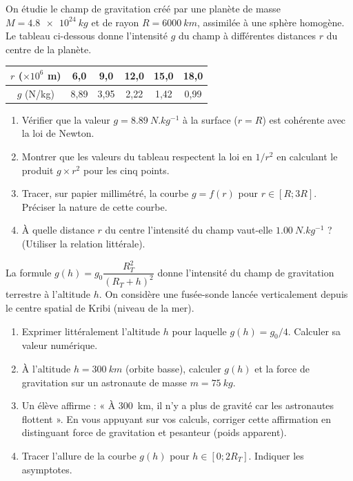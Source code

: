 \documentclass[11pt]{article}
\begin{document}
\begin{exercice}
On étudie le champ de gravitation créé par une planète de masse $M = \SI{4,8e24}{kg}$ et de rayon $R = \SI{6000}{km}$, assimilée à une sphère homogène. Le tableau ci-dessous donne l'intensité $g$ du champ à différentes distances $r$ du centre de la planète.

\begin{center}
\begin{tabular}{|c|c|c|c|c|c|}
\hline
$r$ ($\times 10^6$ m) & 6,0 & 9,0 & 12,0 & 15,0 & 18,0 \\
\hline
$g$ (N/kg) & 8,89 & 3,95 & 2,22 & 1,42 & 0,99 \\
\hline
\end{tabular}
\end{center}

\begin{enumerate}
    \item Vérifier que la valeur $g = \SI{8,89}{N.kg^{-1}}$ à la surface ($r=R$) est cohérente avec la loi de Newton.
    \item Montrer que les valeurs du tableau respectent la loi en $1/r^2$ en calculant le produit $g \times r^2$ pour les cinq points.
    \item Tracer, sur papier millimétré, la courbe $g = f(r)$ pour $r \in [R; 3R]$. Préciser la nature de cette courbe.
    \item À quelle distance $r$ du centre l'intensité du champ vaut-elle $\SI{1,00}{N.kg^{-1}}$ ? (Utiliser la relation littérale).
\end{enumerate}
\end{exercice}

\begin{exercice}
La formule $g(h) = g_0 \dfrac{R_T^2}{(R_T+h)^2}$ donne l'intensité du champ de gravitation terrestre à l'altitude $h$.
On considère une fusée-sonde lancée verticalement depuis le centre spatial de Kribi (niveau de la mer).
\begin{enumerate}
    \item Exprimer littéralement l'altitude $h$ pour laquelle $g(h) = g_0/4$. Calculer sa valeur numérique.
    \item À l'altitude $h = \SI{300}{km}$ (orbite basse), calculer $g(h)$ et la force de gravitation sur un astronaute de masse $m = \SI{75}{kg}$.
    \item Un élève affirme : « À \SI{300}{km}, il n'y a plus de gravité car les astronautes flottent ». En vous appuyant sur vos calculs, corriger cette affirmation en distinguant \og force de gravitation \fg{} et \og pesanteur \fg{} (poids apparent).
    \item Tracer l'allure de la courbe $g(h)$ pour $h \in [0; 2R_T]$. Indiquer les asymptotes.
\end{enumerate}
\end{exercice}
\end{document}
